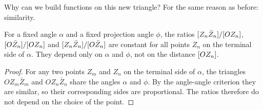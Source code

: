 Why can we build functions on this new triangle? For the same reason as before: similarity.

\begin{proposition}\label{prop:constancy}
For a fixed angle $\alpha$ and a fixed projection angle $\phi$, the ratios $[Z_n \bar{Z}_n]/[OZ_n]$, $[O\bar{Z}_n]/[OZ_n]$ and $[Z_n \bar{Z}_n]/[O\bar{Z}_n]$ are constant for all points $Z_n$ on the terminal side of $\alpha$. They depend only on $\alpha$ and $\phi$, not on the distance $[OZ_n]$.
\end{proposition}

\begin{proof}
For any two points $Z_m$ and $Z_n$ on the terminal side of $\alpha$, the triangles $OZ_m\bar{Z}_m$ and $OZ_n\bar{Z}_n$ share the angles $\alpha$ and $\phi$. By the angle-angle criterion they are similar, so their corresponding sides are proportional. The ratios therefore do not depend on the choice of the point.
\end{proof}


